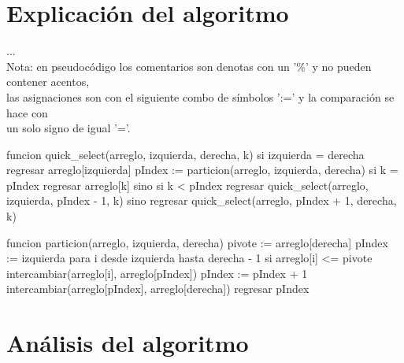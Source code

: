 \documentclass{article}
\begin{document}
\section{Explicación del algoritmo}\label{explicacion}				%
...\\
Nota: en pseudocódigo los comentarios son denotas con un '\%' y no pueden contener acentos,\\
las asignaciones son con el siguiente combo de símbolos ':=' y la comparación se hace con\\
un solo signo de igual '='.
\begin{code}
  funcion quick_select(arreglo, izquierda, derecha, k)
    si izquierda = derecha
        regresar arreglo[izquierda]
    pIndex := particion(arreglo, izquierda, derecha)
    si k = pIndex
        regresar arreglo[k]
    sino si k < pIndex
        regresar quick_select(arreglo, izquierda, pIndex - 1, k)
    sino
        regresar quick_select(arreglo, pIndex + 1, derecha, k)

funcion particion(arreglo, izquierda, derecha)
    pivote := arreglo[derecha]
    pIndex := izquierda
    para i desde izquierda hasta derecha - 1
        si arreglo[i] <= pivote
            intercambiar(arreglo[i], arreglo[pIndex])
            pIndex := pIndex + 1
    intercambiar(arreglo[pIndex], arreglo[derecha])
    regresar pIndex
\end{code}

\section{Análisis del algoritmo}\label{AdA}
\end{document}
